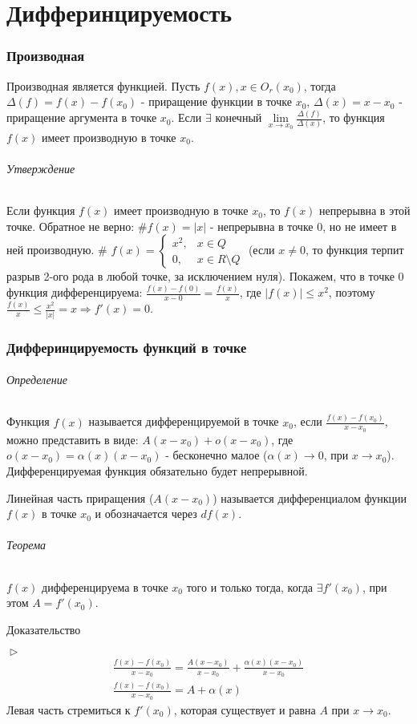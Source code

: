 \documentclass[10pt]{article}
\newcommand{\limx}[1]{\lim\limits_{x \to #1}}
\begin{document}
\part{Дифферинцируемость}
		\section{Производная}
		Производная является функцией. Пусть $f(x), x \in O_r(x_0)$, тогда $\varDelta(f) = f(x) - f(x_0)$ - приращение функции в точке $x_0$, $\varDelta(x) = x-x_0$ - приращение аргумента в точке $x_0$. Если $\exists$ конечный $\limx{x_0} \frac{\varDelta(f)}{\varDelta(x)}$, то функция $f(x)$ имеет производную в точке $x_0$.
		\paragraph{Утверждение} Если функция $f(x)$ имеет производную в точке $x_0$, то $f(x)$ непрерывна в этой точке. Обратное не верно: \#$f(x) = |x|$ - непрерывна в точке 0, но не имеет в ней производную. \# $f(x) = \begin{cases}
			x^2, & x\in Q \\
			0, & x \in R\setminus Q
		\end{cases}$ 
		(если $x \neq 0$, то функция терпит разрыв 2-ого рода в любой точке, за исключением нуля). Покажем, что в точке 0 функция дифференцируема: $\frac{f(x) - f(0)}{x - 0} = \frac{f(x)}{x}$, где $|f(x)| \leq x^2$, поэтому $\frac{f(x)}{x} \leq \frac{x^2}{|x|} = x \Rightarrow f'(x) = 0$.
		
		\section{Дифферинцируемость функций в точке}
		\paragraph{Определение}
		Функция $f(x)$ называется дифференцируемой в точке $x_0$, если $\frac{f(x) - f(x_0)}{x - x_0}$, можно представить в виде: $A(x - x_0) + o(x - x_0)$, где $o(x-x_0) = \alpha(x)(x-x_0)$ - бесконечно малое ($\alpha(x) \to 0$, при $x \to x_0$). Дифференцируемая функция обязательно будет непрерывной.
		
		Линейная часть приращения ($A(x - x_0)$) называется дифференциалом функции $f(x)$ в точке $x_0$ и обозначается через $df(x)$.
		
		\paragraph{Теорема}
		$f(x)$ дифференцируема в точке $x_0$ того и только тогда, когда $\exists f'(x_0)$, при этом $A = f'(x_0)$.
		\subparagraph{Доказательство} \text{}
		$\vartriangleright$
		\begin{eqnarray}
		\nonumber \frac{f(x) - f(x_0)}{x - x_0} = \frac{A(x-x_0)}{x-x_0} + \frac{\alpha(x)(x - x_0)}{x-x_0}\\
		\nonumber \frac{f(x) - f(x_0)}{x-x_0} = A + \alpha(x)
		\end{eqnarray}
		Левая часть стремиться к $f'(x_0)$, которая существует и равна $A$ при $x \to x_0$.
		
\end{document}

